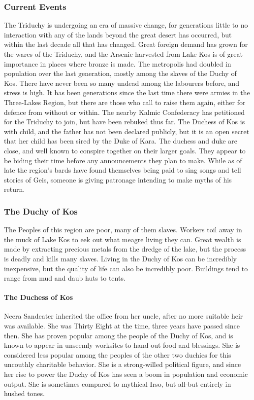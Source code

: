 \subsubsection{Current Events}
The Triduchy is undergoing an era of massive change, for generations little to no interaction with any of the lands beyond the great desert has occurred, but within the last decade all that has changed. 
Great foreign demand has grown for the wares of the Triduchy, and the Arsenic harvested from Lake Kos is of great importance in places where bronze is made. The metropolis had doubled in population over the last generation, mostly among the slaves of the Duchy of Kos. 
There have never been so many undead among the labourers before, and stress is high. It has been generations since the last time there were armies in the Three-Lakes Region, but there are those who call to raise them again, either for defence from without or within. 
The nearby Kalmic Confederacy has petitioned for the Triduchy to join, but have been rebuked thus far.
The Duchess of Kos is with child, and the father has not been declared publicly, but it is an open secret that her child has been sired by the Duke of Kara. 
The duchess and duke are close, and well known to conspire together on their larger goals. 
They appear to be biding their time before any announcements they plan to make. 
While as of late the region’s bards have found themselves being paid to sing songs and tell stories of Geis, someone is giving patronage intending to make myths of his return.

\subsubsection{The Duchy of Kos}
The Peoples of this region are poor, many of them slaves. Workers toil away in the muck of Lake Kos to eek out what meagre living they can. Great wealth is made by extracting precious metals from the dredge of the lake, but the process is deadly and kills many slaves. Living in the Duchy of Kos can be incredibly inexpensive, but the quality of life can also be incredibly poor. Buildings tend to range from mud and daub huts to tents.

\paragraph{The Duchess of Kos}
Neera Sandeater inherited the office from her uncle, after no more suitable heir was available. She was Thirty Eight at the time, three years have passed since then. She has proven popular among the people of the Duchy of Kos, and is known to appear in unseemly worksites to hand out food and blessings. She is considered less popular among the peoples of the other two duchies for this uncouthly charitable behavior. She is a strong-willed political figure, and since her rise to power the Duchy of Kos has seen a boom in population and economic output. She is sometimes compared to mythical Irso, but all-but entirely in hushed tones.

